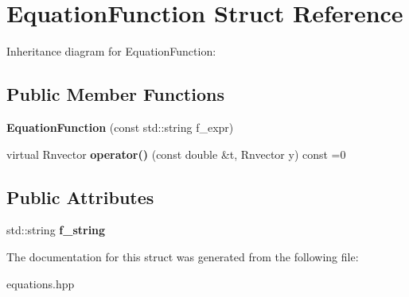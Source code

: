 \hypertarget{structEquationFunction}{}\section{Equation\+Function Struct Reference}
\label{structEquationFunction}


Inheritance diagram for Equation\+Function\+:
\subsection*{Public Member Functions}
\begin{DoxyCompactItemize}
\item 
\mbox{\label{structEquationFunction_a7383ee64812c81fcb46ad0ccd20bac3b}} 
{\bfseries Equation\+Function} (const std\+::string f\+\_\+expr)
\item 
\mbox{\label{structEquationFunction_ade0f7a750ab9e61eea68636ced6dc1b7}} 
virtual Rnvector {\bfseries operator()} (const double \&t, Rnvector y) const =0
\end{DoxyCompactItemize}
\subsection*{Public Attributes}
\begin{DoxyCompactItemize}
\item 
\mbox{\label{structEquationFunction_a21ef5c7c24a9d4539d150479a07eea32}} 
std\+::string {\bfseries f\+\_\+string}
\end{DoxyCompactItemize}


The documentation for this struct was generated from the following file\+:\begin{DoxyCompactItemize}
\item 
equations.\+hpp\end{DoxyCompactItemize}
